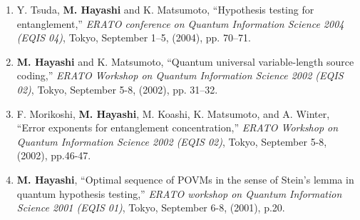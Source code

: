 \documentclass[a4paper,12pt,oneside]{article}
\begin{document}
\begin{enumerate}
\item
Y. Tsuda, \textbf{M. Hayashi} and K. Matsumoto, ``Hypothesis testing for entanglement,'' 
{\em ERATO conference on Quantum Information Science 2004 (EQIS 04)}, 
Tokyo, September 1--5, (2004), 
pp. 70--71.

\item
\textbf{M. Hayashi} and K. Matsumoto, ``Quantum universal variable-length source coding,'' 
{\em ERATO Workshop on Quantum Information Science 2002 (EQIS 02)}, 
Tokyo, September 5-8, (2002), 
pp. 31--32.

\item
F. Morikoshi, \textbf{M. Hayashi}, M. Koashi, K. Matsumoto, and A. Winter, ``Error exponents for entanglement concentration,'' 
{\em ERATO Workshop on Quantum Information Science 2002 (EQIS 02)}, 
Tokyo, September 5-8, (2002), 
pp.46-47.

\item
\textbf{M. Hayashi}, ``Optimal sequence of POVMs in the sense of Stein's lemma in quantum hypothesis testing,'' 
{\em ERATO workshop on Quantum Information Science 2001 (EQIS 01)}, 
Tokyo, September 6-8, (2001), p.20.

\end{enumerate}
\end{document}
